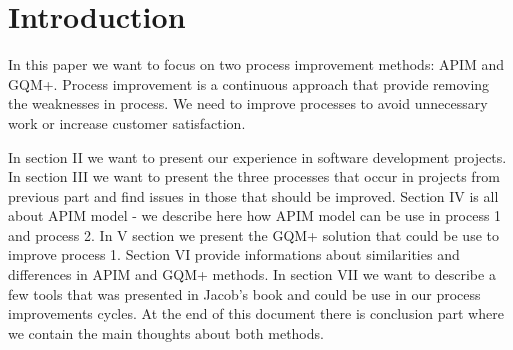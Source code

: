 \section{Introduction}
In this paper we want to focus on two process improvement methods: APIM and GQM+. Process improvement is a continuous approach that provide removing the weaknesses in process.  We need to improve processes to avoid unnecessary work or increase customer satisfaction. 

In section II we want to present our experience in software development projects. In section III we want to present the three processes that occur in projects from previous part and find issues in those that should be improved. Section IV is all about APIM model - we describe here how APIM model can be use in process 1 and process 2. In V section we present the GQM+ solution that could be use to improve process 1. Section VI provide informations about similarities and differences in APIM and GQM+ methods. In section VII we want to describe a few tools that was presented in Jacob's book \cite{jacobs} and could be use in our process improvements cycles. At the end of this document there is conclusion part where we contain the main thoughts about both methods.